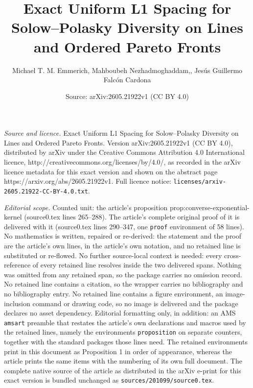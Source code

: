 \documentclass[10pt,a4paper]{amsart}
\title{Exact Uniform L1 Spacing for Solow--Polasky Diversity on Lines and Ordered Pareto Fronts}
\author{Michael T. M. Emmerich, Mahboubeh Nezhadmoghaddam,, Jes\'us Guillermo Falc\'on Cardona}
\date{Source: arXiv:2605.21922v1 (CC BY 4.0)}
\begin{document}
\maketitle

\noindent\emph{Source and licence.} Exact Uniform L1 Spacing for Solow--Polasky Diversity on Lines and Ordered Pareto Fronts. Version arXiv:2605.21922v1 (CC BY 4.0), distributed by arXiv under the Creative Commons Attribution 4.0 International licence, http://creativecommons.org/licenses/by/4.0/, as recorded in the arXiv licence metadata for this exact version and shown on the abstract page https://arxiv.org/abs/2605.21922v1. Full licence notice: \texttt{licenses/arxiv-2605.21922-CC-BY-4.0.txt}.\par\smallskip

\noindent\textit{Editorial scope.} Counted unit: the article's proposition prop:converse-exponential-kernel (source0.tex lines 265--288). The article's complete original proof of it is delivered with it (source0.tex lines 290--347, one \texttt{proof} environment of 58 lines). No mathematics is written, repaired or re-derived: the statement and the proof are the article's own lines, in the article's own notation, and no retained line is substituted or re-flowed.  No further source-local context is needed: every cross-reference of every retained line resolves inside the two delivered spans.  Nothing was omitted from any retained span, so the package carries no omission record.  No retained line contains a citation, so the wrapper carries no bibliography and no bibliography entry.  No retained line contains a figure environment, an image-inclusion command or drawing code, so no image is delivered and the package declares no asset dependency.  Editorial formatting only, in addition: an AMS \texttt{amsart} preamble that restates the article's own declarations and macros used by the retained lines, namely the environments \texttt{proposition} on separate counters, together with the standard packages those lines need.  The retained environments print in this document as Proposition 1 in order of appearance, whereas the article prints the same items with the numbering of its own full document.  The complete native source of the article as distributed in the arXiv e-print for this exact version is bundled unchanged as \texttt{sources/201099/source0.tex}.
\end{document}

